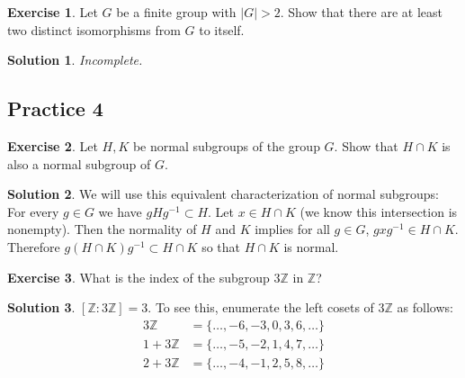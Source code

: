 \documentclass[12pt]{article}
\theoremstyle{definition}
\newcommand{\Z}{\mathbb{Z}}
\newtheorem{exercise}{\color{YellowOrange}Exercise}
\theoremstyle{definition}
\newtheorem{solution}{\color{Goldenrod}Solution}
\begin{document}
\begin{exercise}
Let $G$ be a finite group with $|G| > 2$. Show that there are at least two distinct isomorphisms from $G$ to itself. 
\end{exercise}
\begin{solution}
\it Incomplete.
\end{solution}

\subsection{Practice 4}

\begin{exercise}
Let $H, K$ be normal subgroups of the group $G$. Show that $H \cap K$ is also a normal subgroup of $G$.
\end{exercise}
\begin{solution}
We will use this equivalent characterization of normal subgroups: For every $g \in G$ we have $gHg^{-1} \subset H$. Let $x \in H \cap K$ (we know this intersection is nonempty). Then the normality of $H$ and $K$ implies for all $g \in G$, $gxg^{-1} \in H \cap K$. Therefore $g (H \cap K) g^{-1} \subset H \cap K$ so that $H \cap K$ is normal.
\end{solution}

\begin{exercise}
What is the index of the subgroup $3 \Z$ in $\Z$?
\end{exercise}
\begin{solution}
$[\Z : 3 \Z] = 3$. To see this, enumerate the left cosets of $3\Z$ as follows:
\begin{align*}
3 \Z &= \{ \ldots, -6, -3, 0, 3, 6, \ldots \} \\
1 + 3 \Z &= \{ \ldots, -5, -2, 1, 4, 7, \ldots \} \\
2 + 3 \Z &= \{ \ldots, -4, -1, 2, 5, 8, \ldots \}
\end{align*}
\end{solution}
\end{document}
